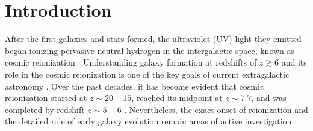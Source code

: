 \documentclass[twocolumn]{aastex631}
\begin{document}


\section{Introduction} \label{sec:intro}
After the first galaxies and stars formed, the ultraviolet (UV) light they emitted began ionizing pervasive neutral hydrogen in the intergalactic space, known as cosmic reionization \citep[for reviews, see][]{Brom2011,Madau2014}.
Understanding galaxy formation at redshifts of $z\gtrsim6$ and its role in the cosmic reionization is one of the key goals of current extragalactic astronomy \citep[e.g.,][]{Planck2016,Wise2019,Robertson2022}. 
Over the past decades, it has become evident that cosmic reionization started at $z\sim20$ -- $15$, reached its midpoint at $z\sim7.7$, and was completed by redshift $z\sim5-6$ \citep[e.g.,][]{Fan2006, Hoag2019}.
Nevertheless, the exact onset of reionization and the detailed role of early galaxy evolution remain areas of active investigation.
\end{document}
